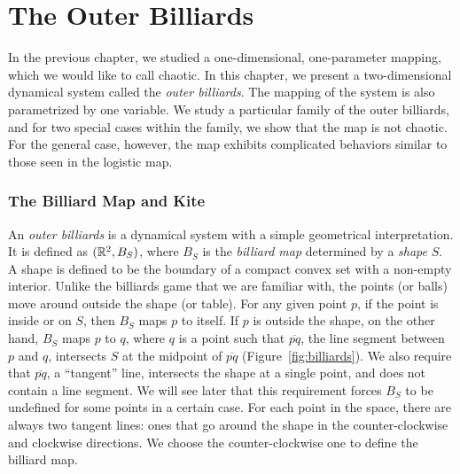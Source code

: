 \documentclass[10pt,twoside]{book}
\begin{document}
\chapter{The Outer Billiards}
\label{chap:billiards}
In the previous chapter, we studied a one-dimensional, one-parameter mapping, which we would like to call chaotic.
In this chapter, we present a two-dimensional dynamical system called the \textit{outer billiards}.
The mapping of the system is also parametrized by one variable. 
We study a particular family of the outer billiards, and for two special cases within the family, we show that the map is not chaotic.
For the general case, however, the map exhibits complicated behaviors similar to those seen in the logistic map.

\subsection*{The Billiard Map and Kite}
An \textit{outer billiards} is a dynamical system with a simple geometrical interpretation.
It is defined as $(\mathbb{R}^2, B_S)$, where $B_S$ is the \textit{billiard map} determined by a \textit{shape} $S$.
A shape is defined to be the boundary of a compact convex set with a non-empty interior.
Unlike the billiards game that we are familiar with, the points (or balls) move around outside the shape (or table).
For any given point $p$, if the point is inside or on $S$, then $B_S$ maps $p$ to itself.
If $p$ is outside the shape, on the other hand, $B_S$ maps $p$ to $q$, where $q$ is a point such that $\overline{pq}$, the line segment between $p$ and $q$, intersects $S$ at the midpoint of $\overline{pq}$ (Figure~\ref{fig:billiards}).
We also require that $\overline{pq}$, a ``tangent'' line, intersects the shape at a single point, and does not contain a line segment.
We will see later that this requirement forces $B_S$ to be undefined for some points in a certain case.
For each point in the space, there are always two tangent lines: ones that go around the shape in the counter-clockwise and clockwise directions.
We choose the counter-clockwise one to define the billiard map.
\end{document}

